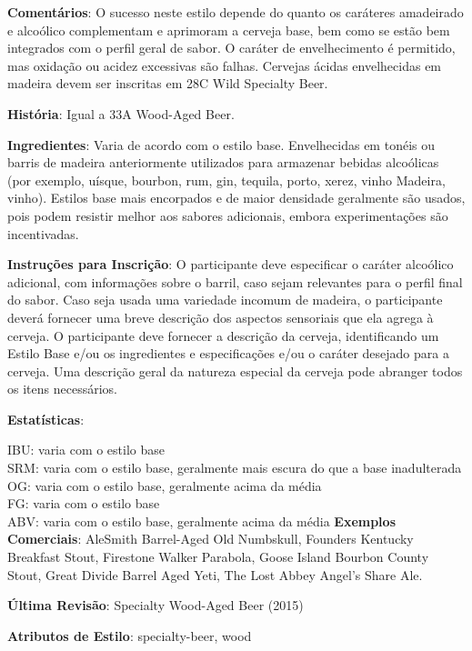 \textbf{Comentários}: O sucesso neste estilo depende do quanto os caráteres amadeirado e alcoólico complementam e aprimoram a cerveja base, bem como se estão bem integrados com o perfil geral de sabor. O caráter de envelhecimento é permitido, mas oxidação ou acidez excessivas são falhas. Cervejas ácidas envelhecidas em madeira devem ser inscritas em 28C Wild Specialty Beer.

\textbf{História}: Igual a 33A Wood-Aged Beer.

\textbf{Ingredientes}: Varia de acordo com o estilo base. Envelhecidas em tonéis ou barris de madeira anteriormente utilizados para armazenar bebidas alcoólicas (por exemplo, uísque, bourbon, rum, gin, tequila, porto, xerez, vinho Madeira, vinho). Estilos base mais encorpados e de maior densidade geralmente são usados, pois podem resistir melhor aos sabores adicionais, embora experimentações são incentivadas.

\textbf{Instruções para Inscrição}: O participante deve especificar o caráter alcoólico adicional, com informações sobre o barril, caso sejam relevantes para o perfil final do sabor. Caso seja usada uma variedade incomum de madeira, o participante deverá fornecer uma breve descrição dos aspectos sensoriais que ela agrega à cerveja. O participante deve fornecer a descrição da cerveja, identificando um Estilo Base e/ou os ingredientes e especificações e/ou o caráter desejado para a cerveja. Uma descrição geral da natureza especial da cerveja pode abranger todos os itens necessários.

\textbf{Estatísticas}:

IBU: varia com o estilo base\\
SRM: varia com o estilo base, geralmente mais escura do que a base inadulterada\\
OG: varia com o estilo base, geralmente acima da média\\
FG: varia com o estilo base\\
ABV: varia com o estilo base, geralmente acima da média
\textbf{Exemplos Comerciais}: AleSmith Barrel-Aged Old Numbskull, Founders Kentucky Breakfast Stout, Firestone Walker Parabola, Goose Island Bourbon County Stout, Great Divide Barrel Aged Yeti, The Lost Abbey Angel’s Share Ale.

\textbf{Última Revisão}: Specialty Wood-Aged Beer (2015)

\textbf{Atributos de Estilo}: specialty-beer, wood
